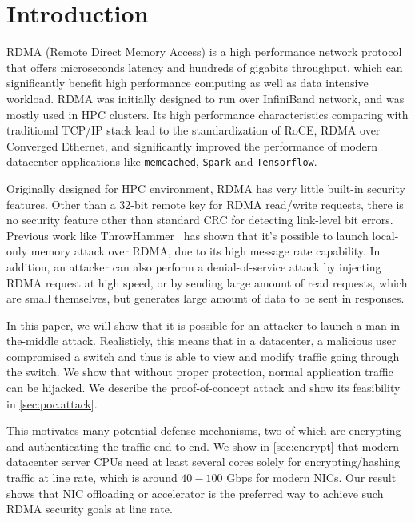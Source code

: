 \section{Introduction}
\label{sec:intro}

RDMA (Remote Direct Memory Access) is a high performance network protocol that offers microseconds latency and hundreds of gigabits throughput,
which can significantly benefit high performance computing as well as data intensive workload. RDMA was initially designed to run over InfiniBand network,
and was mostly used in HPC clusters. Its high performance characteristics comparing with traditional TCP/IP stack lead to the standardization of RoCE,
RDMA over Converged Ethernet, and significantly improved the performance of modern datacenter applications like \texttt{memcached}, \texttt{Spark} and \texttt{Tensorflow}.

Originally designed for HPC environment, RDMA has very little built-in security features. Other than a 32-bit remote key for RDMA read/write requests,
there is no security feature other than standard CRC for detecting link-level bit errors. Previous work like ThrowHammer~\cite{216055} has shown that
it's possible to launch local-only memory attack over RDMA, due to its high message rate capability. In addition, an attacker can also perform a
denial-of-service attack by injecting RDMA request at high speed, or by sending large amount of read requests, which are small themselves, but
generates large amount of data to be sent in responses.

In this paper, we will show that it is possible for an attacker to launch a man-in-the-middle attack. Realisticly, this means that in a datacenter,
a malicious user compromised a switch and thus is able to view and modify traffic going through the switch. We show that without proper protection,
normal application traffic can be hijacked. We describe the proof-of-concept attack and show its feasibility in \autoref{sec:poc.attack}.

This motivates many potential defense mechanisms, two of which are encrypting and authenticating the traffic end-to-end.
We show in \autoref{sec:encrypt} that modern datacenter server CPUs need at least several cores solely
for encrypting/hashing traffic at line rate, which is around $40 - 100$ Gbps for modern NICs.
Our result shows that NIC offloading or accelerator is the preferred way to achieve such RDMA security goals at line rate.
